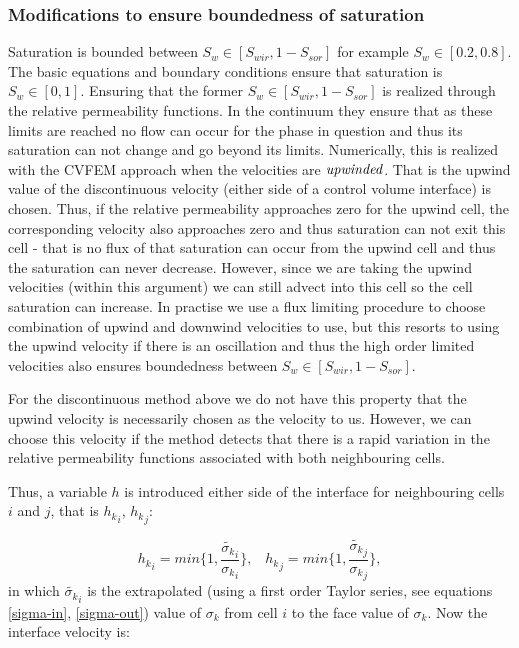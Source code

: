 \subsubsection{Modifications to ensure boundedness of saturation}
Saturation is bounded between $S_w\in \left[ S_{wir}, 1-S_{sor} \right]$
for example $S_w\in \left[ 0.2, 0.8 \right]$.
The basic equations and boundary conditions ensure that saturation is $S_w\in \left[0, 1\right]$.
Ensuring that the former $S_w\in \left[ S_{wir}, 1-S_{sor} \right]$ is realized through the relative
permeability functions. In the continuum they ensure that as these limits are reached
no flow can occur for the phase in question and thus its saturation can not change and go
beyond its limits.
Numerically, this is realized with the CVFEM approach when the velocities are $\it upwinded$.
That is the upwind value of the discontinuous velocity (either side of a control volume interface)
is chosen. Thus, if the relative permeability approaches zero for the upwind cell, the
corresponding velocity also approaches zero and thus saturation can not exit this cell - that is
no flux of that saturation can occur from the upwind cell and thus the saturation can
never decrease. However, since we are taking the upwind velocities (within this argument)
we can still advect into this cell so the cell saturation can increase.
In practise we use a flux limiting procedure to choose combination of
upwind and downwind velocities to use, but this resorts to using the upwind velocity if
there is an oscillation and thus the high order limited velocities also ensures
boundedness between $S_w\in\left[ S_{wir}, 1-S_{sor} \right]$.

For the discontinuous method above we do not have this property that the upwind velocity is
necessarily chosen as the velocity to us. However, we can choose this velocity if
the method detects that there is a rapid variation in the relative permeability functions
associated with both neighbouring cells.

Thus, a variable $h$ is introduced either side of the interface for
neighbouring cells $i$ and $j$, that is ${h_k}_{i}$, ${h_k}_{j}$:

\begin{equation}
{h_k}_{i} = min\{ 1,  \frac{\tilde{\sigma_k}_i}{{\sigma_k}_i} \}, \;\;\;
{h_k}_{j} = min\{ 1,  \frac{\tilde{\sigma_k}_j}{{\sigma_k}_j} \},
\end{equation}
in which $\tilde{\sigma_k}_i$ is the extrapolated (using a first order Taylor series, see equations
\ref{sigma-in}, \ref{sigma-out})
value of $\sigma_k$ from cell $i$ to the
face value of $\sigma_k$.
Now the interface velocity is:

